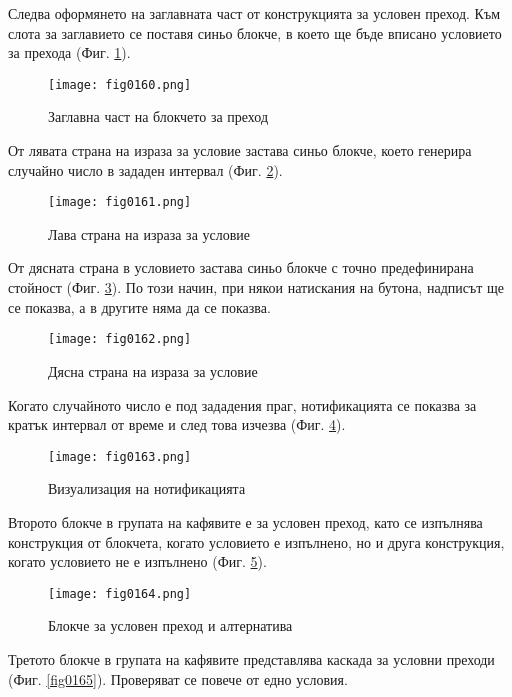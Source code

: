 Следва оформянето на заглавната част от конструкцията за условен преход. Към слота за заглавието се поставя синьо блокче, в което ще бъде вписано условието за прехода (Фиг. \ref{fig0160}).

\begin{figure}[H]
  \centering
  \texttt{[image: fig0160.png]}
  \caption{Заглавна част на блокчето за преход}
\label{fig0160}
\end{figure}

От лявата страна на израза за условие застава синьо блокче, което генерира случайно число в зададен интервал (Фиг. \ref{fig0161}).

\begin{figure}[H]
  \centering
  \texttt{[image: fig0161.png]}
  \caption{Лава страна на израза за условие}
\label{fig0161}
\end{figure}

От дясната страна в условието застава синьо блокче с точно предефинирана стойност (Фиг. \ref{fig0162}). По този начин, при някои натискания на бутона, надписът ще се показва, а в другите няма да се показва. 

\begin{figure}[H]
  \centering
  \texttt{[image: fig0162.png]}
  \caption{Дясна страна на израза за условие}
\label{fig0162}
\end{figure}

Когато случайното число е под зададения праг, нотификацията се показва за кратък интервал от време и след това изчезва (Фиг. \ref{fig0163}).

\begin{figure}[H]
  \centering
  \texttt{[image: fig0163.png]}
  \caption{Визуализация на нотификацията}
\label{fig0163}
\end{figure}

Второто блокче в групата на кафявите е за условен преход, като се изпълнява конструкция от блокчета, когато условието е изпълнено, но и друга конструкция, когато условието не е изпълнено (Фиг. \ref{fig0164}).

\begin{figure}[H]
  \centering
  \texttt{[image: fig0164.png]}
  \caption{Блокче за условен преход и алтернатива}
\label{fig0164}
\end{figure}

Третото блокче в групата на кафявите представлява каскада за условни преходи (Фиг. \ref{fig0165}). Проверяват се повече от едно условия.

